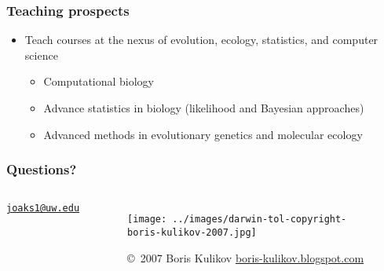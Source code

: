 \begin{frame}
    \frametitle{Teaching prospects}
    \begin{itemize}[<+->]
        \item Teach courses at the nexus of evolution, ecology, statistics,
            and computer science
        \begin{itemize}
            \item Computational biology
            \item Advance statistics in biology (likelihood and Bayesian
                approaches)
            \item Advanced methods in evolutionary genetics and
                molecular ecology
        \end{itemize}
    \end{itemize}
\end{frame}


\begin{frame}
    \frametitle{Questions?}    
    \begin{columns}[c]
        \begin{center}
            {
            \Large
            \href{mailto:joaks1@uw.edu}{\tt joaks1@uw.edu}
            }
        \end{center}
            \begin{figure}
                \begin{center}
                \texttt{[image: ../images/darwin-tol-copyright-boris-kulikov-2007.jpg]}
                \caption{\tiny \copyright~2007 Boris Kulikov \href{http://boris-kulikov.blogspot.com/}{boris-kulikov.blogspot.com}}
                \end{center}
            \end{figure}
    \end{columns}
\end{frame}




